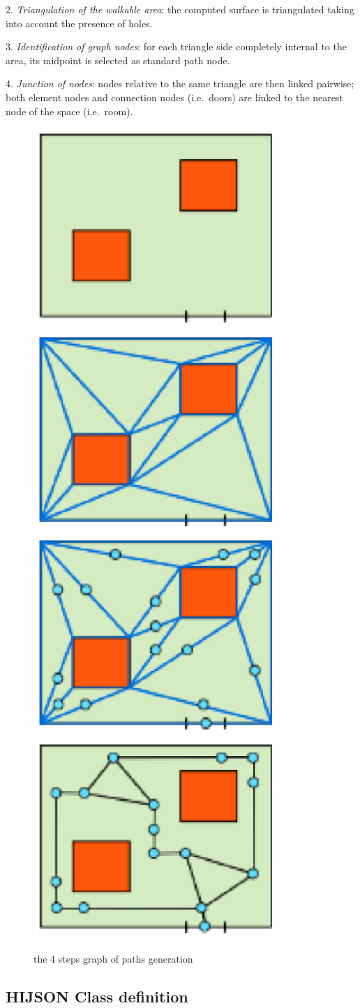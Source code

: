 2. \textit{Triangulation of the walkable area}: the computed surface is
 triangulated taking into account the presence of holes.

3. \textit{Identification of graph nodes}: for each triangle side completely
 internal to the area, its midpoint is selected as standard path node.

4. \textit{Junction of nodes}: nodes relative to the same triangle are then linked
 pairwise; both element nodes and connection nodes (i.e.~doors) are
 linked to the nearest node of the space (i.e.~room).

\begin{figure}[!htbp]
 \centering
 \includegraphics[angle=-90,origin=c,width=.22\linewidth]{images/graph-generation/single/graph-generation-1}
 ~
 \includegraphics[angle=-90,origin=c,width=.22\linewidth]{images/graph-generation/single/graph-generation-2}
 ~
 \includegraphics[angle=-90,origin=c,width=.22\linewidth]{images/graph-generation/single/graph-generation-3}
 ~
 \includegraphics[angle=-90,origin=c,width=.22\linewidth]{images/graph-generation/single/graph-generation-4}

 \caption{the 4 steps graph of paths generation}
 \label{fig:graph-generation}
\end{figure}

\subsection{HIJSON Class definition}\label{hijson-class-definition}

